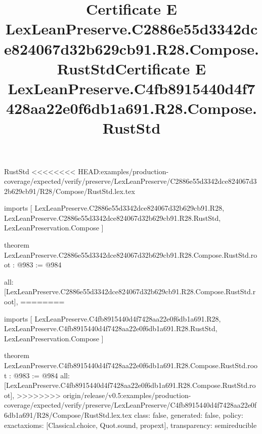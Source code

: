 \begin{lexlean}{RustStd}
<<<<<<<< HEAD:examples/production-coverage/expected/verify/preserve/LexLeanPreserve/C2886e55d3342dce824067d32b629cb91/R28/Compose/RustStd.lex.tex
\title{Certificate E LexLeanPreserve.C2886e55d3342dce824067d32b629cb91.R28.Compose.RustStd}
\begin{coremodule}
imports [
  LexLeanPreserve.C2886e55d3342dce824067d32b629cb91.R28,
  LexLeanPreserve.C2886e55d3342dce824067d32b629cb91.R28.RustStd,
  LexLeanPreservation.Compose
]

theorem LexLeanPreserve.C2886e55d3342dce824067d32b629cb91.R28.Compose.RustStd.root : @983 := @984 {
  all: [LexLeanPreserve.C2886e55d3342dce824067d32b629cb91.R28.Compose.RustStd.root],
========
\title{Certificate E LexLeanPreserve.C4fb8915440d4f7428aa22e0f6db1a691.R28.Compose.RustStd}
\begin{coremodule}
imports [
  LexLeanPreserve.C4fb8915440d4f7428aa22e0f6db1a691.R28,
  LexLeanPreserve.C4fb8915440d4f7428aa22e0f6db1a691.R28.RustStd,
  LexLeanPreservation.Compose
]

theorem LexLeanPreserve.C4fb8915440d4f7428aa22e0f6db1a691.R28.Compose.RustStd.root : @983 := @984 {
  all: [LexLeanPreserve.C4fb8915440d4f7428aa22e0f6db1a691.R28.Compose.RustStd.root],
>>>>>>>> origin/release/v0.5:examples/production-coverage/expected/verify/preserve/LexLeanPreserve/C4fb8915440d4f7428aa22e0f6db1a691/R28/Compose/RustStd.lex.tex
  class: false,
  generated: false,
  policy: exact{axioms: [Classical.choice, Quot.sound, propext]},
  transparency: semireducible
}


\end{coremodule}}
\end{coremodule}
\end{lexlean}
